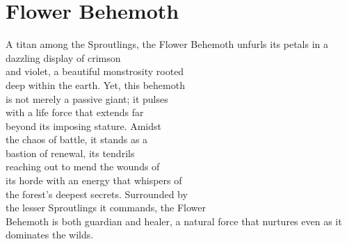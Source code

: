 \section*{Flower Behemoth}\label{sec:FlowerBehemoth}
A titan among the Sproutlings, the Flower Behemoth unfurls its petals in a dazzling display of crimson\\and violet, a beautiful monstrosity rooted\\deep within the earth. Yet, this behemoth\\is not merely a passive giant; it pulses\\with a life force that extends far\\beyond its imposing stature. Amidst\\the chaos of battle, it stands as a\\bastion of renewal, its tendrils\\reaching out to mend the wounds of\\its horde with an energy that whispers of\\the forest's deepest secrets. Surrounded by\\the lesser Sproutlings it commands, the Flower\\Behemoth is both guardian and healer, a natural force that nurtures even as it dominates the wilds.
